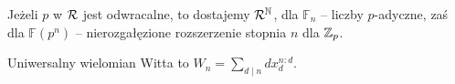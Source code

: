 Jeżeli $p$ w $\mathcal R$ jest odwracalne, to dostajemy $\mathcal R^\mathbb N$, dla $\mathbb F_n$ -- liczby $p$-adyczne, zaś dla $\mathbb F(p^n)$ -- nierozgałęzione rozszerzenie stopnia $n$ dla $\mathbb Z_p$.

\begin{definicja}
	Uniwersalny wielomian Witta to $W_n = \sum_{d \mid n} d x_d^{n : d}$.
\end{definicja}


